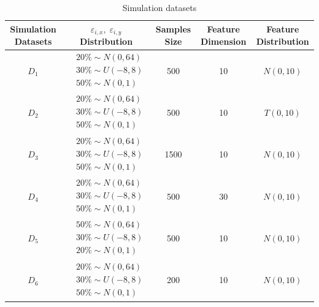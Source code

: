 \documentclass[final,3p,times]{elsarticle}
\begin{document}
\begin{table}[t!]
  \centering
  \begin{threeparttable}
    \caption{Simulation datasets \label{tab2}}
    \begin{tabular}{ccccc}
    \toprule
    Simulation Datasets & $\varepsilon_{i,x},\;\varepsilon_{i,y}$ Distribution & Samples Size & Feature Dimension & Feature Distribution \\
    \midrule
    $D_1$ & $\begin{aligned}&20\%\sim N(0,64)\\&30\%\sim U(-8,8)\\&50\%\sim N(0,1)\end{aligned}$ & 500 & 10 & $N(0,10)$ \\
    \midrule
    $D_2$ & $\begin{aligned}&20\%\sim N(0,64)\\&30\%\sim U(-8,8)\\&50\%\sim N(0,1)\end{aligned}$ & 500 & 10 & $T(0,10)$ \\
    \midrule
    $D_3$ & $\begin{aligned}&20\%\sim N(0,64)\\&30\%\sim U(-8,8)\\&50\%\sim N(0,1)\end{aligned}$ & 1500 & 10 & $N(0,10)$ \\
    \midrule
    $D_4$ & $\begin{aligned}&20\%\sim N(0,64)\\&30\%\sim U(-8,8)\\&50\%\sim N(0,1)\end{aligned}$ & 500 & 30 & $N(0,10)$ \\
    \midrule
    $D_5$ & $\begin{aligned}&50\%\sim N(0,64)\\&30\%\sim U(-8,8)\\&20\%\sim N(0,1)\end{aligned}$ & 500 & 10 & $N(0,10)$ \\
    \midrule
    $D_6$ & $\begin{aligned}&20\%\sim N(0,64)\\&30\%\sim U(-8,8)\\&50\%\sim N(0,1)\end{aligned}$ & 200 & 10 & $N(0,10)$ \\
    \bottomrule
    \end{tabular}
  \end{threeparttable}

\end{table}
\end{document}
